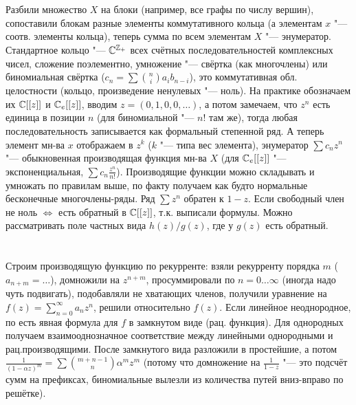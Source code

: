 \section{} %
Разбили множество $X$ на блоки (например, все графы по числу вершин), сопоставили блокам разные элементы
коммутативного кольца (а элементам $x$ "--- соотв. элементы кольца), теперь сумма по всем элементам $X$ "--- энумератор.
Стандартное кольцо "--- $\mathbb{C}^{\mathbb{Z}_+}$ всех счётных последовательностей комплексных чисел, сложение поэлементно,
умножение "--- свёртка (как многочлены) или биномиальная свёртка ($c_n=\sum \binom{n}{i}a_ib_{n-i}$), это коммутативная
обл. целостности (кольцо, произведение ненулевых "--- ноль).
На практике обозначаем их $\mathbb{C}[[z]]$ и $\mathbb{C}_e[[z]]$, вводим $z=(0,1,0,0,\dots)$, а потом замечаем, что $z^n$ есть единица в позиции $n$
(для биномиальной "--- $n!$ там же), тогда любая последовательность записывается как формальный степенной ряд.
А теперь элемент мн-ва $x$ отображаем в $z^k$ ($k$ "--- типа вес элемента), энумератор $\sum c_nz^n$ "--- обыкновенная производящая функция
мн-ва $X$ (для $\mathbb{C}_e[[z]]$ "--- экспоненциальная, $\sum c_n\frac{z^n}{n!}$).
Производящие функции можно складывать и умножать по правилам выше, по факту получаем как будто нормальные бесконечные многочлены-ряды.
Ряд $\sum z^n$ обратен к $1-z$.
Если свободный член не ноль $\iff$ есть обратный в $\mathbb{C}[[z]]$, т.к. выписали формулы.
Можно рассматривать поле частных вида $h(z)/g(z)$, где у $g(z)$ есть обратный.

\section{} %
Строим производящую функцию по рекурренте: взяли рекурренту порядка $m$ ($a_{n+m}=\dots$), домножили на $z^{n+m}$, просуммировали по $n=0\dots\infty$
(иногда надо чуть подвигать), подобавляли не хватающих членов, получили уравнение на $f(z)=\sum_{n=0}^\infty a_nz^n$, решили
относительно $f(z)$.
Если линейное неоднородное, по есть явная формула для $f$ в замкнутом виде (рац. функция).
Для однородных получаем взаимооднозначное соответствие между линейными однородными и рац.производящими.
После замкнутого вида разложили в простейшие, а потом $\frac{1}{(1-\alpha z)^m}=\sum \binom{m+n-1}{n} \alpha^m z^m$ (потому что домножение
на $\frac{1}{1-z}$ "--- это подсчёт сумм на префиксах, биномиальные вылезли из количества путей вниз-вправо по решётке).

